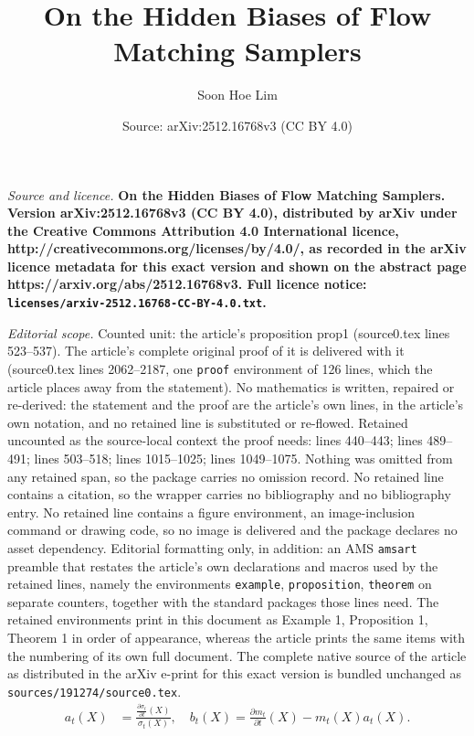 \documentclass[10pt,a4paper]{amsart}
\title{\bf On the Hidden Biases of Flow Matching Samplers}
\author{Soon Hoe Lim}
\date{Source: arXiv:2512.16768v3 (CC BY 4.0)}
\begin{document}
\maketitle

\noindent\emph{Source and licence.} \bf On the Hidden Biases of Flow Matching Samplers. Version arXiv:2512.16768v3 (CC BY 4.0), distributed by arXiv under the Creative Commons Attribution 4.0 International licence, http://creativecommons.org/licenses/by/4.0/, as recorded in the arXiv licence metadata for this exact version and shown on the abstract page https://arxiv.org/abs/2512.16768v3. Full licence notice: \texttt{licenses/arxiv-2512.16768-CC-BY-4.0.txt}.\par\smallskip

\noindent\textit{Editorial scope.} Counted unit: the article's proposition prop1 (source0.tex lines 523--537). The article's complete original proof of it is delivered with it (source0.tex lines 2062--2187, one \texttt{proof} environment of 126 lines, which the article places away from the statement). No mathematics is written, repaired or re-derived: the statement and the proof are the article's own lines, in the article's own notation, and no retained line is substituted or re-flowed.  Retained uncounted as the source-local context the proof needs: lines 440--443; lines 489--491; lines 503--518; lines 1015--1025; lines 1049--1075.  Nothing was omitted from any retained span, so the package carries no omission record.  No retained line contains a citation, so the wrapper carries no bibliography and no bibliography entry.  No retained line contains a figure environment, an image-inclusion command or drawing code, so no image is delivered and the package declares no asset dependency.  Editorial formatting only, in addition: an AMS \texttt{amsart} preamble that restates the article's own declarations and macros used by the retained lines, namely the environments \texttt{example}, \texttt{proposition}, \texttt{theorem} on separate counters, together with the standard packages those lines need.  The retained environments print in this document as Example 1, Proposition 1, Theorem 1 in order of appearance, whereas the article prints the same items with the numbering of its own full document.  The complete native source of the article as distributed in the arXiv e-print for this exact version is bundled unchanged as \texttt{sources/191274/source0.tex}.
\begin{align} \label{eq_ab}
    a_t(X) &= \frac{\frac{\partial \sigma_t}{\partial t}(X)}{\sigma_t(X)}, \quad 
    b_t(X) = \frac{\partial m_t}{\partial t}(X) - m_t(X) a_t(X).
\end{align}
\end{document}
